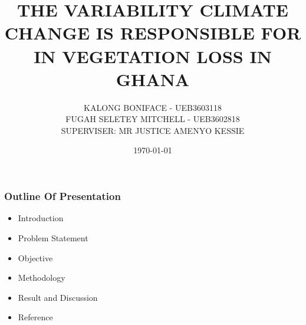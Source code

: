 \documentclass[11pt]{beamer}
\begin{document}
	\author[Group Nine]{KALONG BONIFACE  - UEB3603118\\
		   FUGAH SELETEY MITCHELL  - UEB3602818\\
		  			  SUPERVISER: MR JUSTICE AMENYO KESSIE}  
\title[VARIABILITY CLIMATE CHANGE]{THE VARIABILITY CLIMATE CHANGE IS RESPONSIBLE FOR IN VEGETATION LOSS IN GHANA}
	\date{\today}
	\begin{frame}
		\maketitle
	\end{frame}
	\begin{frame}
		\frametitle{Outline Of Presentation}
		\begin{itemize}
			\item Introduction
			\item Problem Statement
			\item Objective
			\item Methodology
			\item  Result  and Discussion
			\item Reference
		\end{itemize}
	\end{frame}
\end{document}
